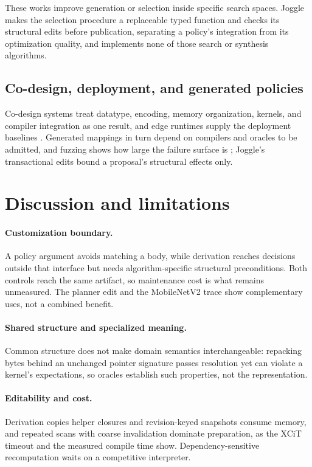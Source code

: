 \documentclass[sigplan,anonymous,review]{acmart}
\begin{document}
These works improve generation or selection inside specific search spaces.
Joggle makes the selection procedure a replaceable typed function and checks its
structural edits before publication, separating a policy's integration from its
optimization quality, and implements none of those search or synthesis
algorithms.

\subsection{Co-design, deployment, and generated policies}
Co-design systems treat datatype, encoding, memory organization, kernels, and
compiler integration as one result, and edge runtimes supply the deployment
baselines \cite{burrello2021dory,lin2020mcunet,wang2024ladder,daghero2025sparse,david2021tflm,ncnnProject,ireeDocs,ye2025flashinfer}.
Generated mappings in turn depend on compilers and oracles to be admitted, and
fuzzing shows how large the failure surface is
\cite{hong2025autocomp,mai2026argus,liu2023nnsmith,ma2023hirgen,zheng2021compilerbugs,xiao2022metamorphic};
Joggle's transactional edits bound a proposal's structural effects only.

\section{Discussion and limitations}
\paragraph{Customization boundary.}
A policy argument avoids matching a body, while derivation reaches decisions
outside that interface but needs algorithm-specific structural preconditions.
Both controls reach the same artifact, so maintenance cost is what remains
unmeasured. The planner edit and the MobileNetV2 trace show complementary uses,
not a combined benefit.

\paragraph{Shared structure and specialized meaning.}
Common structure does not make domain semantics interchangeable: repacking bytes
behind an unchanged pointer signature passes resolution yet can violate a
kernel's expectations, so oracles establish such properties, not the
representation.

\paragraph{Editability and cost.}
Derivation copies helper closures and revision-keyed snapshots consume memory,
and repeated scans with coarse invalidation dominate preparation, as the XCiT
timeout and the measured compile time show. Dependency-sensitive recomputation
waits on a competitive interpreter.
\end{document}
